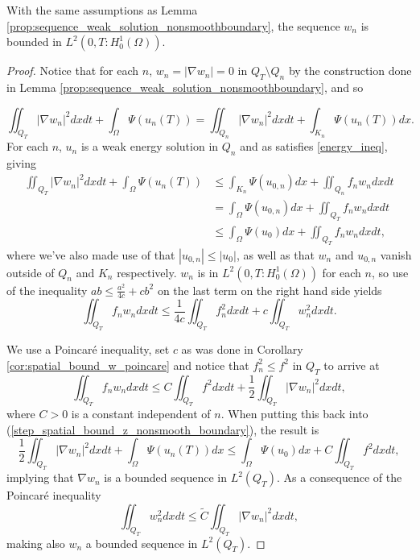 \documentclass[11pt, a4paper]{article}
\begin{document}
\begin{lemma}
\label{prop:w_n_nonsmooth_spatial_boundedness}
With the same assumptions as Lemma \ref{prop:sequence_weak_solution_nonsmoothboundary}, the sequence $w_n$ is bounded in $L^2(0,T: H_0^1(\Omega))$.
\end{lemma}
\begin{proof}
Notice that for each $n$, $w_n= |\nabla w_n|=0$ in $Q_T\setminus Q_n$ by the construction done in Lemma \ref{prop:sequence_weak_solution_nonsmoothboundary}, and so

\begin{equation*}
\iint_{Q_T} |\nabla w_n|^2dxdt + \int_\Omega \Psi(u_n(T)) = \iint_{Q_n}|\nabla w_n|^2dxdt + \int_{K_n} \Psi(u_n(T))dx.
\end{equation*}
For each $n$, $u_n$ is a weak energy solution in $Q_n$ and as satisfies \ref{energy_ineq}, giving
\begin{align}
\label{step_spatial_bound_z_nonsmooth_boundary}
\iint_{Q_T} |\nabla w_n|^2dxdt + \int_\Omega \Psi(u_n(T)) &\leq \int_{K_n}\Psi(u_{0,n})dx + \iint_{Q_n}f_n w_n dxdt \nonumber \\
&= \int_\Omega \Psi(u_{0,n})dx + \iint_{Q_T} f_n w_n dxdt \nonumber\\
& \leq \int_\Omega \Psi(u_0)dx + \iint_{Q_T} f_n w_n dxdt,
\end{align}
where we've also made use of that $|u_{0,n}| \leq |u_0|$, as well as that $w_n$ and $u_{0,n}$ vanish outside of $Q_n$ and $K_n$ respectively.
$w_n$ is in $L^2(0,T:H_0^1(\Omega))$ for each $n$, so use of the inequality $ab \leq \frac{a^2}{4c} + cb^2$ on the last term on the right hand side yields
\begin{equation*}
\iint_{Q_T} f_n w_n dxdt \leq \frac{1}{4c}\iint_{Q_T}f_n^2dxdt + c\iint_{Q_T} w_n^2 dxdt.
\end{equation*}

We use a Poincaré inequality, set $c$ as was done in Corollary \ref{cor:spatial_bound_w_poincare} and notice that $f_n^2 \leq f^2$ in $Q_T$ to arrive at
\begin{equation*}
\iint_{Q_T} f_n w_n dxdt \leq C\iint_{Q_T} f^2dxdt + \frac{1}{2}\iint_{Q_T} |\nabla w_n|^2 dxdt,
\end{equation*}
where $C >0$ is a constant independent of $n$. When putting this back into (\ref{step_spatial_bound_z_nonsmooth_boundary}), the result is
\begin{equation}
\frac{1}{2}\iint_{Q_T} |\nabla w_n|^2 dxdt + \int_\Omega \Psi(u_n(T))dx \leq \int_\Omega \Psi(u_0)dx + C\iint_{Q_T} f^2dxdt,
\end{equation}
implying that $\nabla w_n$ is a bounded sequence in $L^2(Q_T)$. As a consequence of the Poincaré inequality
\begin{equation*}
\iint_{Q_T} w_n^2 dxdt \leq \tilde{C} \iint_{Q_T} |\nabla w_n|^2 dxdt,
\end{equation*}
making also $w_n$ a bounded sequence in $L^2(Q_T)$.

\end{proof}
\end{document}
